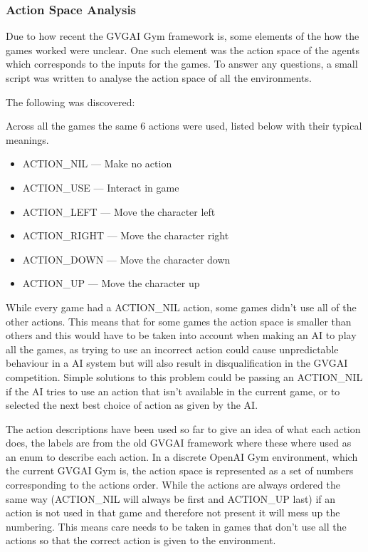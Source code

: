 \documentclass[a4paper]{article}
\begin{document}
\subsubsection{Action Space Analysis}
Due to how recent the GVGAI Gym framework is, some elements of the how the games worked were unclear.
One such element was the action space of the agents which corresponds to the inputs for the games.
To answer any questions, a small script was written to analyse the action space of all the environments.
\par
The following was discovered:
\begin{description}
\setlength{\itemsep}{0pt}
\setlength{\parskip}{0pt}
\item [Total number of actions]
Across all the games the same 6 actions were used, listed below with their typical meanings.
\begin{multicols}{2}
    \begin{itemize}
        \item ACTION\_NIL --- Make no action
        \item ACTION\_USE --- Interact in game
        \item ACTION\_LEFT --- Move the character left
        \item ACTION\_RIGHT --- Move the character right
        \item ACTION\_DOWN --- Move the character down
        \item ACTION\_UP --- Move the character up
    \end{itemize}
\end{multicols}
\item [Not all games used all actions]
While every game had a ACTION\_NIL action, some games didn't use all of the other actions.
This means that for some games the action space is smaller than others and this would have to be taken into account when making an AI to play all the games, as trying to use an incorrect action could cause unpredictable behaviour in a AI system but will also result in disqualification in the GVGAI competition.
Simple solutions to this problem could be passing an ACTION\_NIL if the AI tries to use an action that isn't available in the current game, or to selected the next best choice of action as given by the AI\@.
\item [The Actions weren't numbered the same]
The action descriptions have been used so far to give an idea of what each action does, the labels are from the old GVGAI framework where these where used as an enum to describe each action.
In a discrete OpenAI Gym environment, which the current GVGAI Gym is, the action space is represented as a set of numbers corresponding to the actions order.
While the actions are always ordered the same way (ACTION\_NIL will always be first and ACTION\_UP last) if an action is not used in that game and therefore not present it will mess up the numbering.
This means care needs to be taken in games that don't use all the actions so that the correct action is given to the environment.
\end{description}
\end{document}
